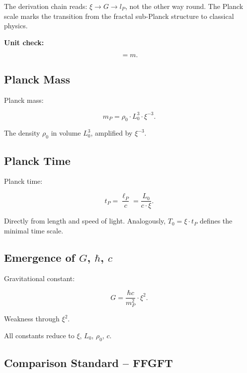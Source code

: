 	The derivation chain reads: \(\xi \to G \to l_P\), not the other way round. The Planck scale marks the transition from the fractal sub-Planck structure to classical physics.
	
	\textbf{Unit check:}
	
	\begin{equation}
		[\ell_P] = \si{m}.
	\end{equation}
	
	\subsection*{Planck Mass}
	
	Planck mass:
	
	\begin{equation}
		m_P = \rho_0 \cdot L_0^3 \cdot \xi^{-3}.
	\end{equation}
	
	The density \(\rho_0\) in volume \(L_0^3\), amplified by \(\xi^{-3}\).
	
	\subsection*{Planck Time}
	
	Planck time:
	
	\begin{equation}
		t_P = \frac{\ell_P}{c} = \frac{L_0}{c \cdot \xi}.
	\end{equation}
	
	Directly from length and speed of light. Analogously, \(T_0 = \xi \cdot t_P\) defines the minimal time scale.
	
	\subsection*{Emergence of \(G\), \(\hbar\), \(c\)}
	
	Gravitational constant:
	
	\begin{equation}
		G = \frac{\hbar c}{m_P^2} \cdot \xi^2.
	\end{equation}
	
	Weakness through \(\xi^2\).
	
	All constants reduce to \(\xi\), \(L_0\), \(\rho_0\), \(c\).
	
	\subsection*{Comparison Standard -- FFGFT}
	
